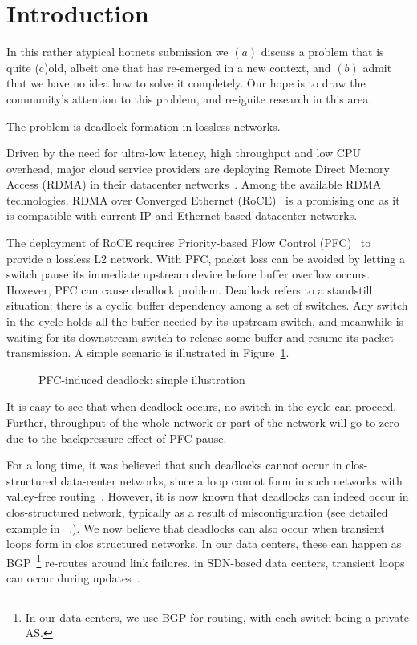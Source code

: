 \section{Introduction}\label{sec:intro}

In this rather atypical hotnets submission we $(a)$ discuss a problem that is
quite (c)old, albeit one that has re-emerged in a new context, and $(b)$ admit
that we have no idea how to solve it completely. Our hope is to draw the
community's attention to this problem, and re-ignite research in this area.

The problem is deadlock formation in lossless networks.

Driven by the need for ultra-low latency, high throughput and low CPU overhead,
major cloud service providers are deploying Remote Direct Memory Access (RDMA) in
their datacenter networks~\cite{dcqcn,timely}. Among the
available RDMA technologies,  RDMA over Converged Ethernet (RoCE)~\cite{roce} is
a promising one as it is compatible with current IP and Ethernet based
datacenter networks.

The deployment of RoCE requires Priority-based Flow Control (PFC)~\cite{pfc} to
provide a lossless L2 network. With PFC, packet loss can be avoided by letting a
switch pause its immediate upstream device before buffer overflow occurs.
However, PFC can cause deadlock problem. Deadlock refers to a
standstill situation: there is a cyclic buffer dependency among a set of
switches. Any switch in the cycle holds all the buffer needed by its upstream
switch, and meanwhile is waiting for its downstream switch to release some
buffer and resume its packet transmission. A simple scenario is illustrated in
Figure~\ref{fig:deadlock_example}.

\begin{figure}
\caption{PFC-induced deadlock: simple illustration}
\label{fig:deadlock_example}
\end{figure}

It is easy to see that when deadlock occurs, no switch in the cycle can proceed.
Further, throughput of the whole network or part of the network will go to zero
due to the backpressure effect of PFC pause. 

For a long time, it was believed that such deadlocks cannot occur in
clos-structured data-center networks, since a loop cannot form in such networks
with valley-free routing~\cite{dcqcn}.  However, it is now known that deadlocks
can indeed occur in clos-structured network, typically as a result of
misconfiguration (see detailed example in ~\cite{rdma-exp}.). We now believe
that deadlocks can also occur when transient loops form in clos structured
networks. In our data centers, these can happen as BGP~\footnote{In our data
centers, we use BGP for routing, with each switch being a private AS.} re-routes
around link failures. in SDN-based data centers, transient loops can occur
during updates~\cite{xxx}.


